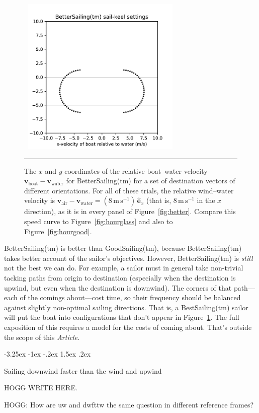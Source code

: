 \documentclass[letterpaper]{article}
\makeatletter
\renewcommand{\vec}[1]{\boldsymbol{#1}}
\newcommand{\uvec}{\vec{\hat{e}}}
\newcommand{\air}{\text{air}}
\newcommand{\water}{\text{water}}
\newcommand{\boat}{\text{boat}}
\newcommand{\vair}{\vec{v}_\air}
\newcommand{\vwater}{\vec{v}_\water}
\newcommand{\vboat}{\vec{v}_\boat}
\newcommand{\mps}{\mathrm{m\,s^{-1}}}
\newcommand{\documentname}{\textsl{Article}}
\newcommand{\figref}[1]{Figure~\ref{#1}}
\renewcommand\section{\@startsection {section}{1}{\z@}%
  {-3.25ex \@plus -1ex \@minus -.2ex}%
  {1.5ex \@plus .2ex}%
  {\raggedright\normalfont\large\bfseries}}
\newcommand{\figurerule}{\rule[1ex]{\textwidth}{0.2pt}}
\makeatother
\begin{document}
\begin{figure}[t!]
  ~\hfill\includegraphics[width=3in]{hourglass-better.pdf}\hfill~
  \caption{The $x$ and $y$ coordinates of the relative boat--water velocity $\vboat-\vwater$ for BetterSailing(tm) for a set of destination vectors of different orientations.
  For all of these trials, the relative wind--water velocity is $\vair-\vwater=(8\,\mps)\,\uvec_x$ (that is, $8\,\mps$ in the $x$ direction), as it is in every panel of \figref{fig:better}.
  Compare this speed curve to \figref{fig:hourglass} and also to \figref{fig:hourgood}.\label{fig:hourbetter}}
  \figurerule
\end{figure}

BetterSailing(tm) is better than GoodSailing(tm), because BetterSailing(tm) takes better account of the sailor's objectives.
However, BetterSailing(tm) is \emph{still} not the best we can do.
For example, a sailor must in general take non-trivial tacking paths from origin to destination (especially when the destination is upwind, but even when the destination is downwind).
The corners of that path---each of the comings about---cost time, so their frequency should be balanced against slightly non-optimal sailing directions.
That is, a BestSailing(tm) sailor will put the boat into configurations that don't appear in \figref{fig:hourbetter}.
The full exposition of this requires a model for the costs of coming about.
That's outside the scope of this \documentname.

\section{Sailing downwind faster than the wind and upwind}\label{sec:upwind}

HOGG WRITE HERE.

HOGG: How are uw and dwfttw the same question in different reference frames?
\end{document}
